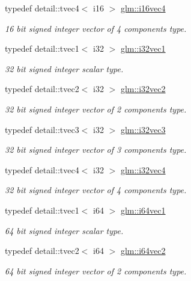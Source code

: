 \begin{DoxyCompactItemize}
typedef detail\-::tvec4$<$ i16 $>$ \hyperlink{group__gtc__type__precision_gaa5ac58e1f15cc47ae8f11cf9849cd9be}{glm\-::i16vec4}
\begin{DoxyCompactList}\small\item\em 16 bit signed integer vector of 4 components type. \end{DoxyCompactList}\item 
typedef detail\-::tvec1$<$ i32 $>$ \hyperlink{group__gtc__type__precision_gaffde115d86f11a3aa35c294de22eb028}{glm\-::i32vec1}
\begin{DoxyCompactList}\small\item\em 32 bit signed integer scalar type. \end{DoxyCompactList}\item 
typedef detail\-::tvec2$<$ i32 $>$ \hyperlink{group__gtc__type__precision_gaa63418303dbcfc01d53f82f659eab5c1}{glm\-::i32vec2}
\begin{DoxyCompactList}\small\item\em 32 bit signed integer vector of 2 components type. \end{DoxyCompactList}\item 
typedef detail\-::tvec3$<$ i32 $>$ \hyperlink{group__gtc__type__precision_ga26740d2ca3314c87950293788455c41a}{glm\-::i32vec3}
\begin{DoxyCompactList}\small\item\em 32 bit signed integer vector of 3 components type. \end{DoxyCompactList}\item 
typedef detail\-::tvec4$<$ i32 $>$ \hyperlink{group__gtc__type__precision_gaa8d1842279485fdc4688969980e9d731}{glm\-::i32vec4}
\begin{DoxyCompactList}\small\item\em 32 bit signed integer vector of 4 components type. \end{DoxyCompactList}\item 
typedef detail\-::tvec1$<$ i64 $>$ \hyperlink{group__gtc__type__precision_ga1a81383845eb8991d3652848249edeb8}{glm\-::i64vec1}
\begin{DoxyCompactList}\small\item\em 64 bit signed integer scalar type. \end{DoxyCompactList}\item 
typedef detail\-::tvec2$<$ i64 $>$ \hyperlink{group__gtc__type__precision_ga8887703a36c5ef093b74abd9e4640c79}{glm\-::i64vec2}
\begin{DoxyCompactList}\small\item\em 64 bit signed integer vector of 2 components type. \end{DoxyCompactList}\item 

\end{DoxyCompactItemize}
